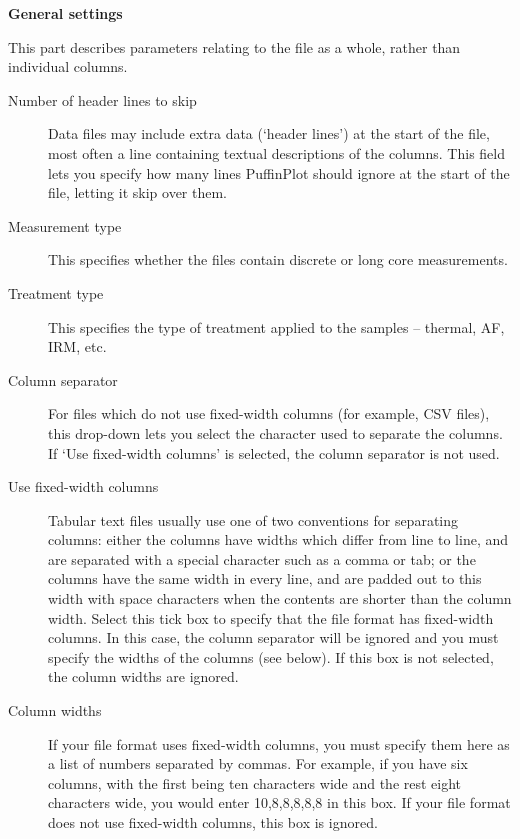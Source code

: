 \documentclass[a4paper,british]{article}
\newcommand{\mypara}[1]{\noindent\textbf{#1}

\noindent\ignorespaces} %
\begin{document}
\mypara{General settings} This part describes parameters relating to the
file as a whole, rather than individual columns.

\begin{description}

\item[Number of header lines to skip] Data files may include extra data
  (`header lines') at the start of the file, most often a line containing
  textual descriptions of the columns. This field lets you specify how many
  lines PuffinPlot should ignore at the start of the file, letting it
  skip over them.

\item[Measurement type] This specifies whether the files contain discrete
  or long core measurements.

\item[Treatment type] This specifies the type of treatment applied to
  the samples -- thermal, AF, IRM, etc.

\item[Column separator] For files which do not use fixed-width columns (for
  example, CSV files), this drop-down lets you select the character used
  to separate the columns. If `Use fixed-width columns' is selected, the
  column separator is not used.

\item[Use fixed-width columns] Tabular text files usually use one of two
  conventions for separating columns: either the columns have widths which
  differ from line to line, and are separated with a special character such
  as a comma or tab; or the columns have the same width in every line, and
  are padded out to this width with space characters when the contents are
  shorter than the column width. Select this tick box to specify that the
  file format has fixed-width columns. In this case, the column separator will
  be ignored and you must specify the widths of the columns (see below).
  If this box is not selected, the column widths are ignored.

\item[Column widths] If your file format uses fixed-width columns, you must
  specify them here as a list of numbers separated by commas. For example, if
  you have six columns, with the first being ten characters wide and the rest
  eight characters wide, you would enter 10,8,8,8,8,8 in this box. If your
  file format does not use fixed-width columns, this box is ignored.

\end{description}
\end{document}

